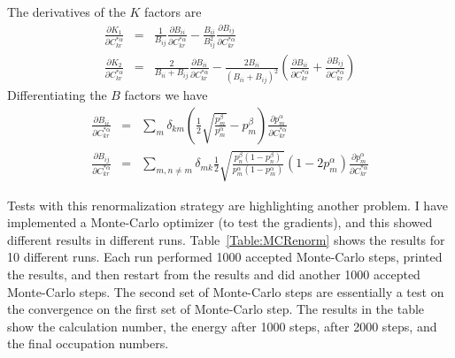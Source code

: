 \documentclass[pra,nofootinbib]{revtex4-1}
\begin{document}
The derivatives of the $K$ factors are
\begin{eqnarray}
  \frac{\partial K_1}{\partial C^{*\alpha}_{kr}}
  &=& \frac{1}{B_{ij}}\frac{\partial B_{ii}}{\partial C^{*\alpha}_{kr}}
   -  \frac{B_{ii}}{B_{ij}^2}\frac{\partial B_{ij}}{\partial C^{*\alpha}_{kr}} \\
  \frac{\partial K_2}{\partial C^{*\alpha}_{kr}}
  &=& \frac{2}{B_{ii}+B_{ij}}\frac{\partial B_{ii}}{\partial C^{*\alpha}_{kr}}
   -  \frac{2B_{ii}}{(B_{ii}+B_{ij})^2}\left(
         \frac{\partial B_{ii}}{\partial C^{*\alpha}_{kr}}
       + \frac{\partial B_{ij}}{\partial C^{*\alpha}_{kr}}
      \right) 
\end{eqnarray}
Differentiating the $B$ factors we have
\begin{eqnarray}
  \frac{\partial B_{ii}}{\partial C^{*\alpha}_{kr}}
  &=& \sum_m \delta_{km}\left(\frac{1}{2}\sqrt{\frac{p_m^\beta}{p_m^\alpha}}-p_m^\beta\right)
      \frac{\partial p_m^\alpha}{\partial C^{*\alpha}_{kr}} \\
  \frac{\partial B_{ij}}{\partial C^{*\alpha}_{kr}}
  &=& \sum_{m,n \ne m}\delta_{mk}\frac{1}{2}
      \sqrt{\frac{p_n^\beta(1-p_n^\beta)}{p_m^\alpha(1-p_m^\alpha)}}\left(1-2p_m^\alpha\right)
      \frac{\partial p_m^\alpha}{\partial C^{*\alpha}_{kr}}
\end{eqnarray}

Tests with this renormalization strategy are highlighting another problem. I have implemented
a Monte-Carlo optimizer (to test the gradients), and this showed different results in
different runs. Table~\ref{Table:MCRenorm} shows the results for 10 different runs. Each run
performed 1000 accepted Monte-Carlo steps, printed the results, and then restart from the
results and did another 1000 accepted Monte-Carlo steps. The second set of Monte-Carlo steps
are essentially a test on the convergence on the first set of Monte-Carlo step. The results in the
table show the calculation number, the energy after 1000 steps, after 2000 steps, and the final
occupation numbers.
\end{document}
